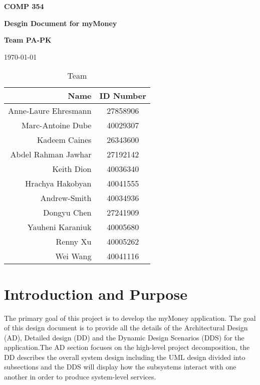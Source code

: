 \documentclass[12pt]{article}
\begin{document}
\vspace*{0.5in}
\centerline{\bf\Large COMP 354}
\centerline{\bf\Large Desgin Document for myMoney}

\vspace*{0.5in}
\centerline{\bf\Large Team PA-PK}



\vspace*{0.5in}
\centerline{\today}

\vspace*{1.5in}
\begin{table}[htbp]
\caption{Team}
\begin{center}
\begin{tabular}{|r | c|}
\hline
Name & ID Number \\
\hline\hline
Anne-Laure Ehresmann & 27858906 \\
\hline
Marc-Antoine Dube & 40029307 \\
\hline
Kadeem Caines & 26343600 \\
\hline
Abdel Rahman Jawhar & 27192142 \\
\hline
Keith Dion & 40036340 \\
\hline
Hrachya Hakobyan & 40041555 \\
\hline
Andrew-Smith & 40034936 \\
\hline
Dongyu Chen & 27241909 \\
\hline
Yauheni Karaniuk & 40005680 \\
\hline
Renny Xu & 40005262\\
\hline
Wei Wang & 40041116 \\
\hline
\end{tabular}
\end{center}
\end{table}

\clearpage

\tableofcontents
\listoffigures
\listoftables

\clearpage


\section{Introduction and Purpose}

The primary goal of this project is to develop the myMoney application. The goal of this design document is to provide all the details of the Architectural Design (AD), Detailed design (DD) and the Dynamic Design Scenarios (DDS) for the application.The AD section
focuses on the high-level project decomposition, the DD describes the overall system design including the UML design divided into subsections
and the DDS will display how the subsystems interact with one another in order to produce system-level services.
\end{document}
